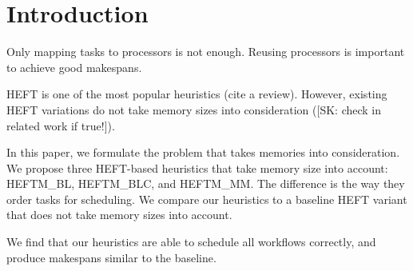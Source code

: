 \documentclass[conference]{IEEEtran}
\newcommand{\algo}[1]{\textsc{#1}}
\newcommand{\heftmm}{\algo{HEFTM\_MM}\xspace}
\newcommand{\heftbl}{\algo{HEFTM\_BL}\xspace}
\newcommand{\heftblc}{\algo{HEFTM\_BLC}\xspace}
\newcommand{\skug}[1]{{\color{blue}[SK: #1]}}
\begin{document}
\begin{abstract}



    \end{abstract}


    \section{Introduction} %

%

    Only mapping tasks to processors is not enough.
    Reusing processors is important to achieve good makespans.

    HEFT is one of the most popular heuristics (cite a review).
    However, existing HEFT variations do not take memory sizes into consideration (\skug{check in related work if true!}).

    In this paper, we formulate the problem that takes memories into consideration.
    We propose three HEFT-based heuristics that take memory size into account: \heftbl, \heftblc, and \heftmm.
    The difference is the way they order tasks for scheduling.
    We compare our heuristics to a baseline HEFT variant that does not take memory sizes into account.

    We find that our heuristics are able to schedule all workflows correctly, and produce makespans similar to the baseline.
\end{document}
